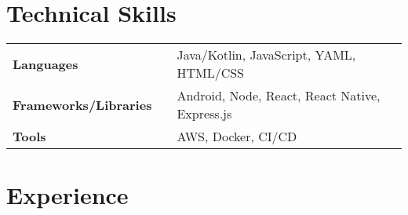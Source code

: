 \documentclass[a4,10pt]{article}
\newcommand{\hskills}[1]{
\textbf{\bfseries #1} }
\begin{document}
\section{Technical Skills}
\begin{tabular}{p{11em} p{1em} p{43em}}
\hskills{Languages }&  &  Java/Kotlin, JavaScript, YAML, HTML/CSS\\
\hskills{Frameworks/Libraries} &  & Android, Node, React, React Native, Express.js\\
\hskills{Tools} &  & AWS, Docker, CI/CD\\
\end{tabular}
\vspace{-0.3cm}


\section{Experience}

        
\end{document}
